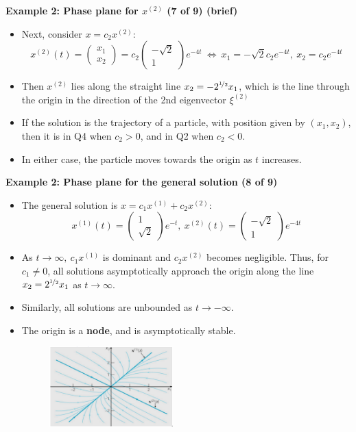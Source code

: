\documentclass[11pt,a4paper]{article}
\begin{document}
	\textbf{Example 2: Phase plane for $x^{(2)}$ (7 of 9) (brief)}
	\begin{itemize}
		\item Next, consider $x = c_2x^{(2)}$:
		$$
		x^{(2)}(t) =
		\begin{pmatrix}
			x_1\\
			x_2
		\end{pmatrix}=c_2
		\begin{pmatrix}
			-\sqrt{2}\\
			1
		\end{pmatrix}e^{-4t}\ \Leftrightarrow\ x_1 = -\sqrt{2}c_2e^{-4t},\ x_2=c_2e^{-4t}
		$$
		\item Then $x^{(2)}$ lies along the straight line $x_2 = -2^{\nicefrac{1}{2}}x_1$, which is the line through the origin in the direction of the 2nd eigenvector $\xi^{(2)}$
		\item If the solution is the trajectory of a particle, with position given by $(x_1, x_2)$, then it is in Q4 when $c_2 > 0$, and in Q2 when $c_2 < 0$.
		\item In either case, the particle moves towards the origin as $t$ increases. 
	\end{itemize}
	\textbf{Example 2: Phase plane for the general solution (8 of 9)}
	\begin{itemize}
		\item The general solution is $x = c_1x^{(1)} + c_2x^{(2)}$:
		$$
		x^{(1)}(t) =
		\begin{pmatrix}
			1\\
			\sqrt{2}
		\end{pmatrix}e^{-t},\ x^{(2)}(t) =
		\begin{pmatrix}
			-\sqrt{2}\\
			1
		\end{pmatrix}e^{-4t}
		$$
		\item As $t\to \infty,\ c_1x^{(1)}$ is dominant and $c_2x^{(2)}$ becomes negligible. Thus, for $c_1 \neq 0$, all solutions asymptotically approach the origin along the line $x_2 = 2^{\nicefrac{1}{2}}x_1$ as $t\to \infty$.
		\item Similarly, all solutions are unbounded as $t \to -\infty$.
		\item The origin is a \textbf{node}, and is asymptotically stable.
		\begin{figure}[H]
			\centering
				\includegraphics[width=0.45\textwidth]{figure/Lec12f5.PNG}
		\end{figure}
	\end{itemize}
\end{document}

